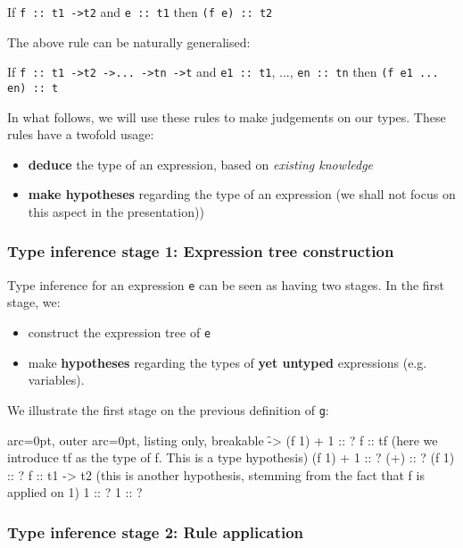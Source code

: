 If \texttt{f :: t1 -\textgreater  t2} and \texttt{e :: t1} then \texttt{(f e) :: t2}

The above rule can be naturally generalised:

If \texttt{f :: t1 -\textgreater  t2 -\textgreater  ... -\textgreater  tn -\textgreater  t} and \texttt{e1 :: t1}, ..., \texttt{en :: tn} then \texttt{(f e1 ... en) :: t}

In what follows, we will use these rules to make judgements on our types. These rules have a twofold usage:
\begin{itemize}
	\item  \textbf{deduce} the type of an expression, based on \textit{existing knowledge}
	\item  \textbf{make hypotheses} regarding the type of an expression (we shall not focus on this aspect in the presentation))
\end{itemize}

\subsubsection*{ Type inference stage 1: Expression tree construction }

Type inference for an expression \texttt{e} can be seen as having two stages. In the first stage, we:
\begin{itemize}
	\item  construct the expression tree of \texttt{e}
	\item  make \textbf{hypotheses} regarding the types of \textbf{yet untyped} expressions (e.g. variables).
\end{itemize}

We illustrate the first stage on the previous definition of \texttt{g}:


\begin{tcblisting}{ arc=0pt, outer arc=0pt, listing only, breakable}
\f -> (f 1) + 1 :: ?
  f :: tf (here we introduce tf as the type of f. This is a type hypothesis)
  (f 1) + 1 :: ?
    (+) :: ?
    (f 1) :: ?
       f :: t1 -> t2 (this is another hypothesis, stemming from the fact that f is applied on 1)
       1 :: ?
    1 :: ?

\end{tcblisting}


\subsubsection*{ Type inference stage 2: Rule application }

